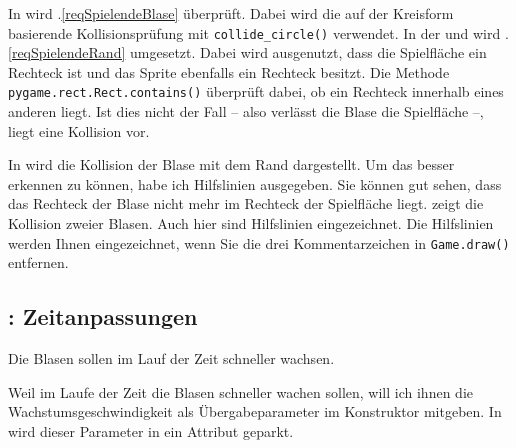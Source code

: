 
In  wird .\ref{reqSpielendeBlase} überprüft. Dabei wird die auf der Kreisform basierende Kollisionsprüfung mit \texttt{collide\_circle()} verwendet. In der  und  wird .\ref{reqSpielendeRand} umgesetzt. Dabei wird ausgenutzt, dass die Spielfläche ein Rechteck ist und das Sprite ebenfalls ein Rechteck besitzt. Die Methode \texttt{pygame.rect.Rect.contains()} überprüft dabei, ob ein Rechteck innerhalb eines anderen liegt. Ist dies nicht der Fall -- also verlässt die Blase die Spielfläche --, liegt eine Kollision vor.

\newpage


In  wird die Kollision der Blase mit dem Rand dargestellt. Um das besser erkennen zu können, habe ich Hilfslinien ausgegeben. Sie können gut sehen, dass das Rechteck der Blase nicht mehr im Rechteck der Spielfläche liegt.  zeigt die Kollision zweier Blasen. Auch hier sind Hilfslinien eingezeichnet. Die Hilfslinien werden Ihnen eingezeichnet, wenn Sie die drei Kommentarzeichen in \texttt{Game.draw()} entfernen.



\subsection{: Zeitanpassungen}
	Die Blasen sollen im Lauf der Zeit schneller wachsen.
\er

Weil im Laufe der Zeit die Blasen schneller wachen sollen, will ich ihnen die Wachstumsgeschwindigkeit als Übergabeparameter im Konstruktor mitgeben. In  wird dieser Parameter in ein Attribut geparkt.


